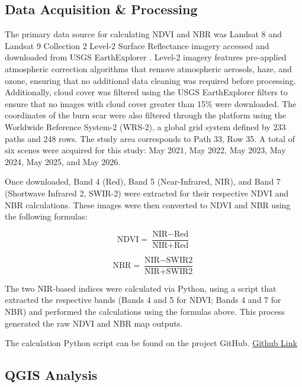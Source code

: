 \documentclass[11pt]{article}
\begin{document}
\subsection{Data Acquisition \& Processing}

The primary data source for calculating NDVI and NBR was Landsat 8 and Landsat 9 Collection 2 Level-2 Surface Reflectance imagery accessed and downloaded from USGS EarthExplorer \cite{usgsEarthExplorer}. Level-2 imagery features pre-applied atmospheric correction algorithms that remove atmospheric aerosols, haze, and ozone, ensuring that no additional data cleaning was required before processing. Additionally, cloud cover was filtered using the USGS EarthExplorer filters to ensure that no images with cloud cover greater than 15\% were downloaded. The coordinates of the burn scar were also filtered through the platform using the Worldwide Reference System-2 (WRS-2), a global grid system defined by 233 paths and 248 rows. The study area corresponds to Path 33, Row 35. A total of six scenes were acquired for this study: May 2021, May 2022, May 2023, May 2024, May 2025, and May 2026.

Once downloaded, Band 4 (Red), Band 5 (Near-Infrared, NIR), and Band 7 (Shortwave Infrared 2, SWIR-2) were extracted for their respective NDVI and NBR calculations. These images were then converted to NDVI and NBR using the following formulas:

\begin{equation}
\text{NDVI} = \frac{\text{NIR} - \text{Red}}{\text{NIR} + \text{Red}}
\end{equation}

\begin{equation}
\text{NBR} = \frac{\text{NIR} - \text{SWIR2}}{\text{NIR} + \text{SWIR2}}
\end{equation}

The two NIR-based indices were calculated via Python, using a script that extracted the respective bands (Bands 4 and 5 for NDVI; Bands 4 and 7 for NBR) and performed the calculations using the formulas above. This process generated the raw NDVI and NBR map outputs.

The calculation Python script can be found on the project GitHub. \href{https://github.com/frhou09/NDVI_vs_NBR2/tree/main}{Github Link}

\subsection{QGIS Analysis}
\end{document}
